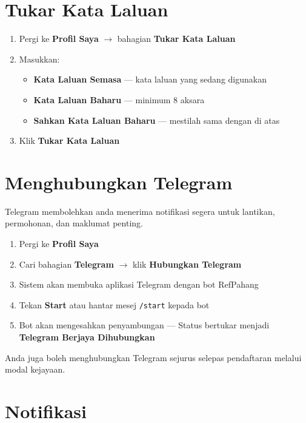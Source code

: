\documentclass[12pt,a4paper]{report}
\newcommand{\menupath}[1]{\textcolor{pbnpblue}{\textbf{#1}}}
\newcommand{\btn}[1]{\colorbox{primaryblue!10}{\textcolor{primaryblue}{\textbf{#1}}}}
\newcommand{\status}[2]{\colorbox{#1!15}{\textcolor{#1}{\small\textbf{#2}}}}
\begin{document}
\section{Tukar Kata Laluan}

\begin{enumerate}[label=\textcolor{pbnpblue}{\textbf{\arabic*.}}, leftmargin=2em]
  \item Pergi ke \menupath{Profil Saya} $\rightarrow$ bahagian \textbf{Tukar Kata Laluan}
  \item Masukkan:
    \begin{itemize}
      \item \textbf{Kata Laluan Semasa} --- kata laluan yang sedang digunakan
      \item \textbf{Kata Laluan Baharu} --- minimum 8 aksara
      \item \textbf{Sahkan Kata Laluan Baharu} --- mestilah sama dengan di atas
    \end{itemize}
  \item Klik \btn{Tukar Kata Laluan}
\end{enumerate}

\section{Menghubungkan Telegram}

Telegram membolehkan anda menerima notifikasi segera untuk lantikan, permohonan, dan maklumat penting.

\begin{enumerate}[label=\textcolor{pbnpblue}{\textbf{\arabic*.}}, leftmargin=2em]
  \item Pergi ke \menupath{Profil Saya}
  \item Cari bahagian \textbf{Telegram} $\rightarrow$ klik \btn{Hubungkan Telegram}
  \item Sistem akan membuka aplikasi Telegram dengan bot RefPahang
  \item Tekan \btn{Start} atau hantar mesej \texttt{/start} kepada bot
  \item Bot akan mengesahkan penyambungan --- Status bertukar menjadi \status{successgreen}{Telegram Berjaya Dihubungkan}
\end{enumerate}

\begin{tipbox}
Anda juga boleh menghubungkan Telegram sejurus selepas pendaftaran melalui modal kejayaan.
\end{tipbox}

\section{Notifikasi}
\end{document}
